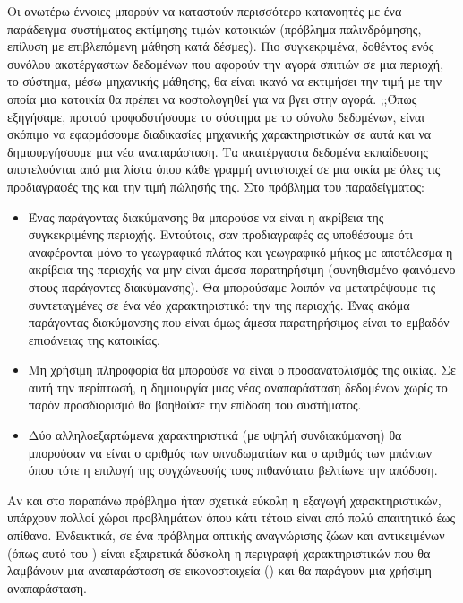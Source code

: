 Οι ανωτέρω έννοιες μπορούν να καταστούν περισσότερο κατανοητές με ένα παράδειγμα συστήματος εκτίμησης τιμών κατοικιών\cite{geron2019hands} (πρόβλημα παλινδρόμησης, επίλυση με επιβλεπόμενη μάθηση κατά δέσμες). Πιο συγκεκριμένα, δοθέντος ενός συνόλου ακατέργαστων δεδομένων που αφορούν την αγορά σπιτιών σε μια περιοχή, το σύστημα, μέσω μηχανικής μάθησης, θα είναι ικανό να εκτιμήσει την τιμή με την οποία μια κατοικία θα πρέπει να κοστολογηθεί για να βγει στην αγορά. ;;Όπως εξηγήσαμε, προτού τροφοδοτήσουμε το σύστημα με το σύνολο δεδομένων, είναι σκόπιμο να εφαρμόσουμε διαδικασίες μηχανικής χαρακτηριστικών σε αυτά και να δημιουργήσουμε μια νέα αναπαράσταση. Τα ακατέργαστα δεδομένα εκπαίδευσης αποτελούνται από μια λίστα όπου κάθε γραμμή αντιστοιχεί σε μια οικία με όλες τις προδιαγραφές της και την τιμή πώλησής της. Στο πρόβλημα του παραδείγματος:
\begin{itemize}
    \item  Ένας παράγοντας διακύμανσης θα μπορούσε να είναι η ακρίβεια της συγκεκριμένης περιοχής. Εντούτοις, σαν προδιαγραφές ας υποθέσουμε ότι αναφέρονται μόνο το γεωγραφικό πλάτος και γεωγραφικό μήκος με αποτέλεσμα η ακρίβεια της περιοχής να μην είναι άμεσα παρατηρήσιμη (συνηθισμένο φαινόμενο στους παράγοντες διακύμανσης). Θα μπορούσαμε λοιπόν να μετατρέψουμε τις συντεταγμένες σε ένα νέο χαρακτηριστικό: την  της περιοχής. Ένας ακόμα παράγοντας διακύμανσης που είναι όμως άμεσα παρατηρήσιμος είναι το εμβαδόν επιφάνειας της κατοικίας.
 \item Μη χρήσιμη πληροφορία θα μπορούσε να είναι ο προσανατολισμός της οικίας. Σε αυτή την περίπτωσή, η δημιουργία μιας νέας αναπαράσταση δεδομένων χωρίς το παρόν προσδιορισμό θα βοηθούσε την επίδοση του συστήματος. 
 \item Δύο αλληλοεξαρτώμενα χαρακτηριστικά (με υψηλή συν\textemdash διακύμανση) θα μπορούσαν να είναι ο αριθμός των υπνοδωματίων και ο αριθμός των μπάνιων όπου τότε η επιλογή της συγχώνευσής τους πιθανότατα βελτίωνε την απόδοση. 
\end{itemize}
\par

Αν και στο παραπάνω πρόβλημα ήταν σχετικά εύκολη η  εξαγωγή χαρακτηριστικών, υπάρχουν πολλοί χώροι προβλημάτων όπου κάτι τέτοιο είναι από πολύ απαιτητικό έως απίθανο. Ενδεικτικά, σε ένα πρόβλημα οπτικής αναγνώρισης ζώων και αντικειμένων (όπως αυτό του \cite{krizhevsky2009learning}) είναι εξαιρετικά δύσκολη η περιγραφή χαρακτηριστικών που θα λαμβάνουν μια αναπαράσταση σε εικονοστοιχεία () και θα παράγουν μια χρήσιμη αναπαράσταση. \par

